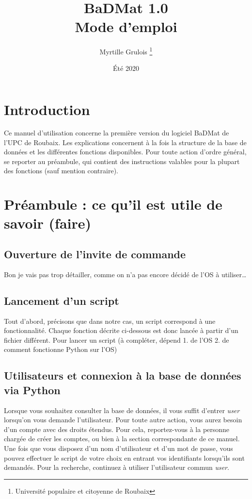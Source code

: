 \documentclass[12pt,a4paper]{article}
\title{\Huge BaDMat 1.0 \\ \LARGE Mode d'emploi} %
\author{Myrtille Grulois \thanks{Université populaire et citoyenne de Roubaix}}
\date{Été 2020}
\begin{document}
\begin{titlepage}
    \maketitle
\end{titlepage}

\tableofcontents
\clearpage

\section*{Introduction}

    Ce manuel d'utilisation concerne la première version du logiciel BaDMat de l'UPC de Roubaix.
    Les explications concernent à la fois la structure de la base de données et les différentes fonctions disponibles.
    Pour toute action d'ordre général, se reporter au préambule, qui contient des instructions valables pour la plupart des fonctions (sauf mention contraire).

\bigskip
\section{Préambule : ce qu'il est utile de savoir (faire)}
    
    \subsection{Ouverture de l'invite de commande}
    
        Bon je vais pas trop détailler, comme on n'a pas encore décidé de l'OS à utiliser\dots
    
    
    \bigskip
    \subsection{Lancement d'un script}
        Tout d'abord, précisons que dans notre cas, un script correspond à une fonctionnalité.
        Chaque fonction décrite ci-dessous est donc lancée à partir d'un fichier différent.
        Pour lancer un script (à compléter, dépend 1. de l'OS 2. de comment fonctionne Python sur l'OS)
    
    \bigskip
    \subsection{Utilisateurs et connexion à la base de données via Python}
        Lorsque vous souhaitez consulter la base de données, il vous suffit d'entrer \emph{user}
        lorsqu'on vous demande l'utilisateur.
        Pour toute autre action, vous aurez besoin d'un compte avec des droits étendus.
        Pour cela, reportez-vous à la personne chargée de créer les comptes, ou bien à la section correspondante de ce manuel.
        Une fois que vous disposez d'un nom d'utilisateur et d'un mot de passe, vous pouvez effectuer le script de
        votre choix en entrant vos identifiants lorsqu'ils sont demandés. Pour la recherche, continuez à utiliser l'utilisateur commun \emph{user}.
    
\end{document}
